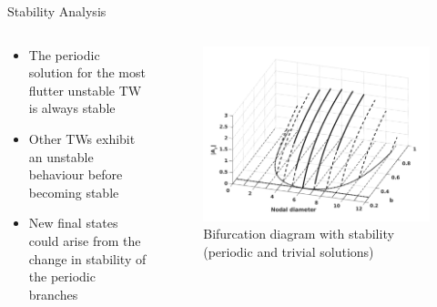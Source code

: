 \documentclass[dvipsnames, aspectratio = 169]{beamer}
\begin{document}
\begin{frame}{Stability Analysis}
	\begin{columns}
		\begin{column}{0.5\textwidth}
			\begin{itemize}
				\item The periodic solution for the most flutter unstable TW is always stable
				\item Other TWs exhibit an unstable behaviour before becoming stable
				\item New final states could arise from the change in stability of the periodic branches
			\end{itemize}
		\end{column}
		\begin{column}{0.5\textwidth}
			\begin{figure}[h]
				\centering
				\includegraphics[width = 1\textwidth]{bifurcation_diagram_stable_1.png}
				\caption{Bifurcation diagram with stability (periodic and trivial solutions)}
				\label{fig:log_TW_amp_bas22}
			\end{figure}
		\end{column}
	\end{columns}
\end{frame}
\end{document}

